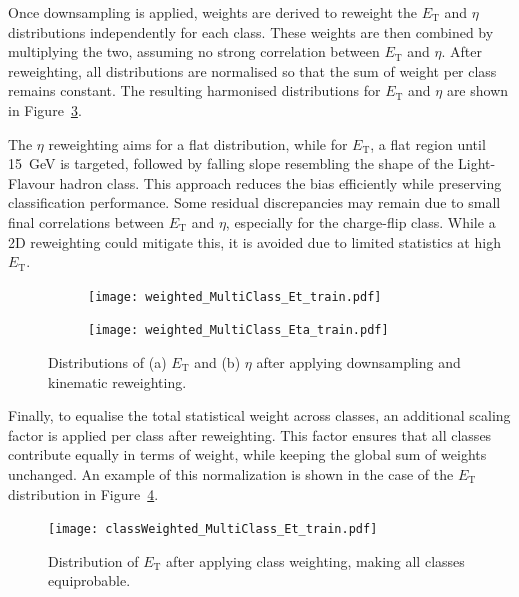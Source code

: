 Once downsampling is applied, weights are derived to reweight the $E_{\text{T}}$ and $\eta$ distributions independently for each class. These weights are then combined by multiplying the two, assuming no strong correlation between $E_{\text{T}}$ and $\eta$. After reweighting, all distributions are normalised so that the sum of weight per class remains constant. The resulting harmonised distributions for $E_{\text{T}}$ and $\eta$ are shown in Figure~\ref{fig:et_eta_reweighted}.

The $\eta$ reweighting aims for a flat distribution, while for $E_{\text{T}}$, a flat region until 15~GeV is targeted, followed by falling slope resembling the shape of the Light-Flavour hadron class. This approach reduces the bias efficiently while preserving classification performance. Some residual discrepancies may remain due to small final correlations between $E_{\text{T}}$ and $\eta$, especially for the charge-flip class. While a 2D reweighting could mitigate this, it is avoided due to limited statistics at high $E_{\text{T}}$.

\begin{figure}[htbp]
  \centering
  \begin{subfigure}[b]{0.6\textwidth}
      \centering
      \texttt{[image: weighted\_MultiClass\_Et\_train.pdf]}
      \caption{}
      \label{fig:et_reweighted}
  \end{subfigure}
  \begin{subfigure}[b]{0.6\textwidth}
      \centering
      \texttt{[image: weighted\_MultiClass\_Eta\_train.pdf]}
      \caption{}
      \label{fig:eta_reweighted}
  \end{subfigure}
  \caption{Distributions of (a) $E_{\text{T}}$ and (b) $\eta$ after applying downsampling and kinematic reweighting.}
  \label{fig:et_eta_reweighted}
\end{figure}

Finally, to equalise the total statistical weight across classes, an additional scaling factor is applied per class after reweighting. This factor ensures that all classes contribute equally in terms of weight, while keeping the global sum of weights unchanged. An example of this normalization is shown in the case of the $E_{\text{T}}$ distribution in Figure~\ref{fig:et_classWeighted}.

\begin{figure}[htbp]
  \centering
  \texttt{[image: classWeighted\_MultiClass\_Et\_train.pdf]}
  \caption{Distribution of $E_{\text{T}}$ after applying class weighting, making all classes equiprobable.}
  \label{fig:et_classWeighted}
\end{figure}



